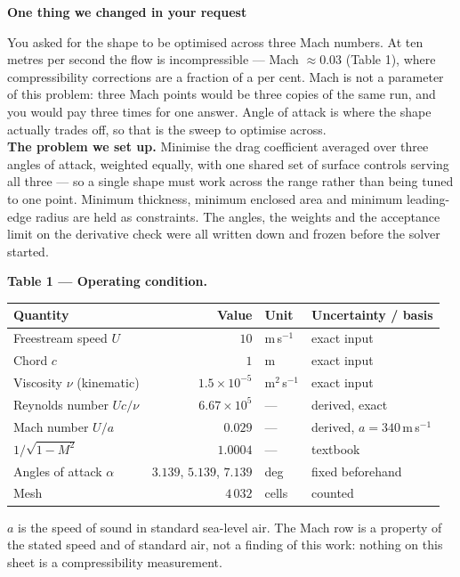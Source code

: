 \documentclass[9pt,a4paper]{article}
\renewcommand{\footnotesize}{\fontsize{6.4}{6.85}\selectfont}
\renewcommand{\scriptsize}{\fontsize{5.7}{6.1}\selectfont}
\begin{document}
\vspace{2.5pt}
\begin{minipage}[t]{0.505\textwidth}
\textbf{One thing we changed in your request}

\vspace{1pt}
{\footnotesize You asked for the shape to be optimised across three Mach
numbers. At ten metres per second the flow is incompressible --- Mach $\approx
0.03$ (Table 1), where compressibility corrections are a fraction of a per
cent. Mach is not a parameter of this problem: three Mach points would be three
copies of the same run, and you would pay three times for one answer. Angle of
attack is where the shape actually trades off, so that is the sweep to optimise
across.\\[2pt]
\textbf{The problem we set up.} Minimise the drag coefficient averaged over
three angles of attack, weighted equally, with one shared set of surface
controls serving all three --- so a single shape must work across the range
rather than being tuned to one point. Minimum thickness, minimum enclosed area
and minimum leading-edge radius are held as constraints. The angles, the
weights and the acceptance limit on the derivative check were all written down
and frozen before the solver started.}
\end{minipage}\hfill
\begin{minipage}[t]{0.475\textwidth}
\textbf{Table 1 --- Operating condition.}

\vspace{1.5pt}
{\fontsize{6.7}{7.9}\selectfont
\begin{tabular}{@{}l r l >{\raggedright\arraybackslash}p{22mm}@{}}
\toprule
Quantity & Value & Unit & Uncertainty / basis \\
\midrule
Freestream speed $U$        & $10$                 & m\,s$^{-1}$    & exact input \\
Chord $c$                   & $1$                  & m              & exact input \\
Viscosity $\nu$ (kinematic) & $1.5\times10^{-5}$   & m$^2$\,s$^{-1}$& exact input \\
Reynolds number $Uc/\nu$    & $6.67\times10^{5}$   & ---            & derived, exact \\
Mach number $U/a$           & $0.029$              & ---            & derived, $a=340$\,m\,s$^{-1}$ \\
$1/\sqrt{1-M^{2}}$          & $1.0004$             & ---            & textbook \\
Angles of attack $\alpha$   & $3.139$, $5.139$, $7.139$ & deg       & fixed beforehand \\
Mesh                        & $4\,032$             & cells          & counted \\
\bottomrule
\end{tabular}}

\vspace{1pt}
{\scriptsize $a$ is the speed of sound in standard sea-level air. The Mach
row is a property of the stated speed and of standard air, not a finding of
this work: nothing on this sheet is a compressibility measurement.}
\end{minipage}
\end{document}

